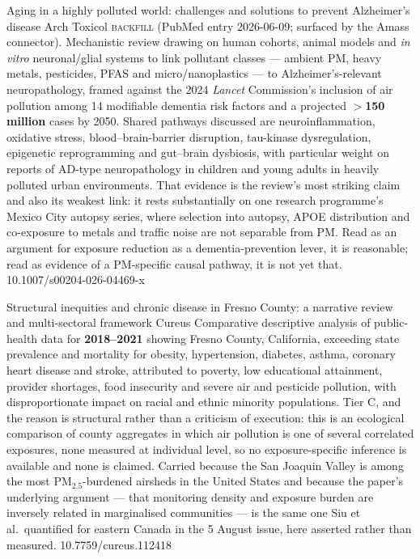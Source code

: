 \documentclass[10pt]{article}
\begin{document}

{Aging in a highly polluted world: challenges and solutions to prevent Alzheimer's disease}
{Arch Toxicol}
{\textsc{backfill} (PubMed entry 2026-06-09; surfaced by the Amass connector). Mechanistic
review drawing on human cohorts, animal models and \textit{in vitro} neuronal/glial
systems to link pollutant classes --- ambient PM, heavy metals, pesticides, PFAS and
micro/nanoplastics --- to Alzheimer's-relevant neuropathology, framed against the 2024
\textit{Lancet} Commission's inclusion of air pollution among 14 modifiable dementia risk
factors and a projected \textbf{$>$150\,million} cases by 2050. Shared pathways discussed
are neuroinflammation, oxidative stress, blood--brain-barrier disruption, tau-kinase
dysregulation, epigenetic reprogramming and gut--brain dysbiosis, with particular weight
on reports of AD-type neuropathology in children and young adults in heavily polluted
urban environments. That evidence is the review's most striking claim and also its
weakest link: it rests substantially on one research programme's Mexico City autopsy
series, where selection into autopsy, APOE distribution and co-exposure to metals and
traffic noise are not separable from PM. Read as an argument for exposure reduction as a
dementia-prevention lever, it is reasonable; read as evidence of a PM-specific causal
pathway, it is not yet that.}
{10.1007/s00204-026-04469-x}


{Structural inequities and chronic disease in Fresno County: a narrative review and
multi-sectoral framework}
{Cureus}
{Comparative descriptive analysis of public-health data for \textbf{2018--2021} showing
Fresno County, California, exceeding state prevalence and mortality for obesity,
hypertension, diabetes, asthma, coronary heart disease and stroke, attributed to poverty,
low educational attainment, provider shortages, food insecurity and severe air and
pesticide pollution, with disproportionate impact on racial and ethnic minority
populations. Tier C, and the reason is structural rather than a criticism of execution:
this is an ecological comparison of county aggregates in which air pollution is one of
several correlated exposures, none measured at individual level, so no exposure-specific
inference is available and none is claimed. Carried because the San Joaquin Valley is
among the most PM$_{2.5}$-burdened airsheds in the United States and because the paper's
underlying argument --- that monitoring density and exposure burden are inversely related
in marginalised communities --- is the same one Siu et al.\ quantified for eastern Canada
in the 5 August issue, here asserted rather than measured.}
{10.7759/cureus.112418}
\end{document}

